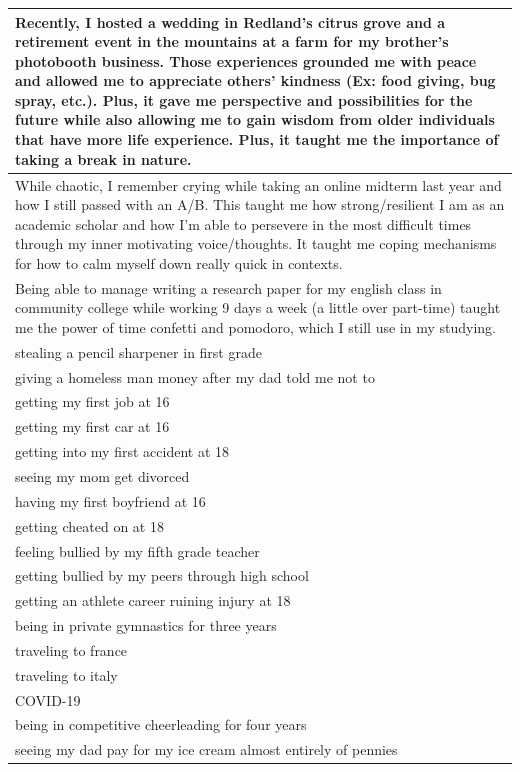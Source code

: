 \documentclass[
  .7em,
  letterpaper,
  DIV=11,
  numbers=noendperiod]{scrartcl}
\begin{document}
\begin{table}
\begin{tabular}{l}
\hline
Recently, I hosted a wedding in Redland's citrus grove and a retirement event in the mountains at a farm for my brother's photobooth business. Those experiences grounded me with peace and allowed me to appreciate others' kindness (Ex: food giving, bug spray, etc.). Plus, it gave me perspective and possibilities for the future while also allowing me to gain wisdom from older individuals that have more life experience. Plus, it taught me the importance of taking a break in nature.\\
\hline
While chaotic, I remember crying while taking an online midterm last year and how I still passed with an A/B. This taught me how strong/resilient I am as an academic scholar and how I'm able to persevere in the most difficult times through my inner motivating voice/thoughts. It taught me coping mechanisms for how to calm myself down really quick in contexts.\\
\hline
Being able to manage writing a research paper for my english class in community college while working 9 days a week (a little over part-time) taught me the power of time confetti and pomodoro, which I still use in my studying.\\
\hline
stealing a pencil sharpener in first grade\\
\hline
giving a homeless man money after my dad told me not to\\
\hline
getting my first job at 16\\
\hline
getting my first car at 16\\
\hline
getting into my first accident at 18\\
\hline
seeing my mom get divorced\\
\hline
having my first boyfriend at 16\\
\hline
getting cheated on at 18\\
\hline
feeling bullied by my fifth grade teacher\\
\hline
getting bullied by my peers through high school\\
\hline
getting an athlete career ruining injury at 18\\
\hline
being in private gymnastics for three years\\
\hline
traveling to france\\
\hline
traveling to italy\\
\hline
COVID-19\\
\hline
being in competitive cheerleading for four years\\
\hline
seeing my dad pay for my ice cream almost entirely of pennies\\

\end{tabular}
\end{table}
\end{document}

